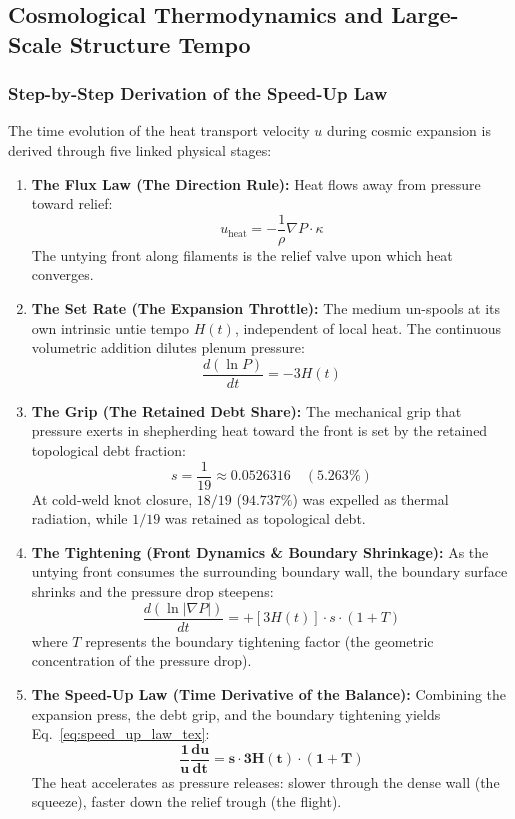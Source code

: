 \documentclass[11pt,a4paper]{article}
\begin{document}
\subsection{Cosmological Thermodynamics and Large-Scale Structure Tempo}
\label{subsec:cosmological_thermo}

\subsubsection{Step-by-Step Derivation of the Speed-Up Law}
\label{subsubsec:speed_up_derivation}

The time evolution of the heat transport velocity $u$ during cosmic expansion is derived through five linked physical stages:
\begin{enumerate}
    \item \textbf{The Flux Law (The Direction Rule):} Heat flows away from pressure toward relief:
    \begin{equation}
    u_{\text{heat}} = -\frac{1}{\rho} \nabla P \cdot \kappa
    \end{equation}
    The untying front along filaments is the relief valve upon which heat converges.
    \item \textbf{The Set Rate (The Expansion Throttle):} The medium un-spools at its own intrinsic untie tempo $H(t)$, independent of local heat. The continuous volumetric addition dilutes plenum pressure:
    \begin{equation}
    \frac{d(\ln P)}{dt} = -3 H(t)
    \end{equation}
    \item \textbf{The Grip (The Retained Debt Share):} The mechanical grip that pressure exerts in shepherding heat toward the front is set by the retained topological debt fraction:
    \begin{equation}
    s = \frac{1}{19} \approx 0.0526316 \quad (5.263\%)
    \end{equation}
    At cold-weld knot closure, $18/19$ ($94.737\%$) was expelled as thermal radiation, while $1/19$ was retained as topological debt.
    \item \textbf{The Tightening (Front Dynamics \& Boundary Shrinkage):} As the untying front consumes the surrounding boundary wall, the boundary surface shrinks and the pressure drop steepens:
    \begin{equation}
    \frac{d(\ln |\nabla P|)}{dt} = + [3 H(t)] \cdot s \cdot (1 + T)
    \end{equation}
    where $T$ represents the boundary tightening factor (the geometric concentration of the pressure drop).
    \item \textbf{The Speed-Up Law (Time Derivative of the Balance):} Combining the expansion press, the debt grip, and the boundary tightening yields Eq.~\eqref{eq:speed_up_law_tex}:
    \begin{equation}
    \mathbf{\frac{1}{u}\frac{du}{dt} = s \cdot 3H(t) \cdot (1 + T)}
    \label{eq:speed_up_law_tex}
    \end{equation}
    The heat accelerates as pressure releases: slower through the dense wall (the squeeze), faster down the relief trough (the flight).
\end{enumerate}
\end{document}
